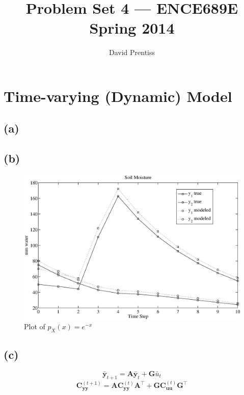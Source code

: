 \documentclass[fleqn, letterpaper]{tufte-handout}
\title{Problem Set 4 --- ENCE689E Spring 2014}
\author{David Prentiss}
\begin{document}
\maketitle

\section{Time-varying (Dynamic) Model}

\subsection{(a)}

{\small
\begin{minipage}{\linewidth}
        
\end{minipage}
}

\subsection{(b)}

\begin{figure}
        \includegraphics[width=\textwidth]{ps5figb}
        \caption{Plot of $p_X(x)=e^{-x}$}
        \label{exprnd}
\end{figure}

\subsection{(c)}

\[
\bar{\mathbf{y}}_{t+1} = \mathbf{A}\bar{\mathbf{y}}_t + \mathbf{G}\bar{u}_t
\]
\[
\mathbf{C}_{\mathbf{yy}}^{(t+1)} = \mathbf{AC}_{\mathbf{yy}}^{(t)}\mathbf{A}^\intercal + \mathbf{GC}_\mathbf{{uu}}^{(t)}\mathbf{G}^\intercal
\]
\end{document}
